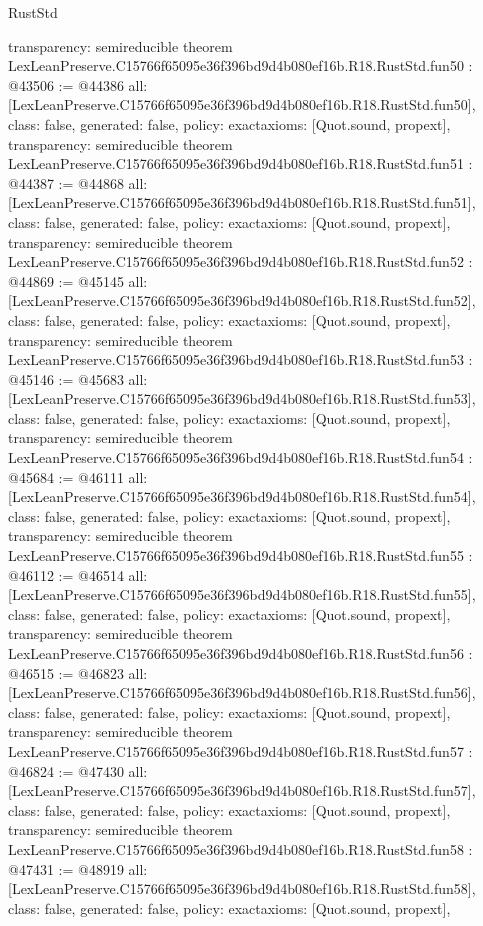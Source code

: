 \begin{lexlean}{RustStd}
\begin{coremodule}
{  transparency: semireducible
}
theorem LexLeanPreserve.C15766f65095e36f396bd9d4b080ef16b.R18.RustStd.fun50 : @43506 := @44386 {
  all: [LexLeanPreserve.C15766f65095e36f396bd9d4b080ef16b.R18.RustStd.fun50],
  class: false,
  generated: false,
  policy: exact{axioms: [Quot.sound, propext]},
  transparency: semireducible
}
theorem LexLeanPreserve.C15766f65095e36f396bd9d4b080ef16b.R18.RustStd.fun51 : @44387 := @44868 {
  all: [LexLeanPreserve.C15766f65095e36f396bd9d4b080ef16b.R18.RustStd.fun51],
  class: false,
  generated: false,
  policy: exact{axioms: [Quot.sound, propext]},
  transparency: semireducible
}
theorem LexLeanPreserve.C15766f65095e36f396bd9d4b080ef16b.R18.RustStd.fun52 : @44869 := @45145 {
  all: [LexLeanPreserve.C15766f65095e36f396bd9d4b080ef16b.R18.RustStd.fun52],
  class: false,
  generated: false,
  policy: exact{axioms: [Quot.sound, propext]},
  transparency: semireducible
}
theorem LexLeanPreserve.C15766f65095e36f396bd9d4b080ef16b.R18.RustStd.fun53 : @45146 := @45683 {
  all: [LexLeanPreserve.C15766f65095e36f396bd9d4b080ef16b.R18.RustStd.fun53],
  class: false,
  generated: false,
  policy: exact{axioms: [Quot.sound, propext]},
  transparency: semireducible
}
theorem LexLeanPreserve.C15766f65095e36f396bd9d4b080ef16b.R18.RustStd.fun54 : @45684 := @46111 {
  all: [LexLeanPreserve.C15766f65095e36f396bd9d4b080ef16b.R18.RustStd.fun54],
  class: false,
  generated: false,
  policy: exact{axioms: [Quot.sound, propext]},
  transparency: semireducible
}
theorem LexLeanPreserve.C15766f65095e36f396bd9d4b080ef16b.R18.RustStd.fun55 : @46112 := @46514 {
  all: [LexLeanPreserve.C15766f65095e36f396bd9d4b080ef16b.R18.RustStd.fun55],
  class: false,
  generated: false,
  policy: exact{axioms: [Quot.sound, propext]},
  transparency: semireducible
}
theorem LexLeanPreserve.C15766f65095e36f396bd9d4b080ef16b.R18.RustStd.fun56 : @46515 := @46823 {
  all: [LexLeanPreserve.C15766f65095e36f396bd9d4b080ef16b.R18.RustStd.fun56],
  class: false,
  generated: false,
  policy: exact{axioms: [Quot.sound, propext]},
  transparency: semireducible
}
theorem LexLeanPreserve.C15766f65095e36f396bd9d4b080ef16b.R18.RustStd.fun57 : @46824 := @47430 {
  all: [LexLeanPreserve.C15766f65095e36f396bd9d4b080ef16b.R18.RustStd.fun57],
  class: false,
  generated: false,
  policy: exact{axioms: [Quot.sound, propext]},
  transparency: semireducible
}
theorem LexLeanPreserve.C15766f65095e36f396bd9d4b080ef16b.R18.RustStd.fun58 : @47431 := @48919 {
  all: [LexLeanPreserve.C15766f65095e36f396bd9d4b080ef16b.R18.RustStd.fun58],
  class: false,
  generated: false,
  policy: exact{axioms: [Quot.sound, propext]},
}
\end{coremodule}
\end{lexlean}

